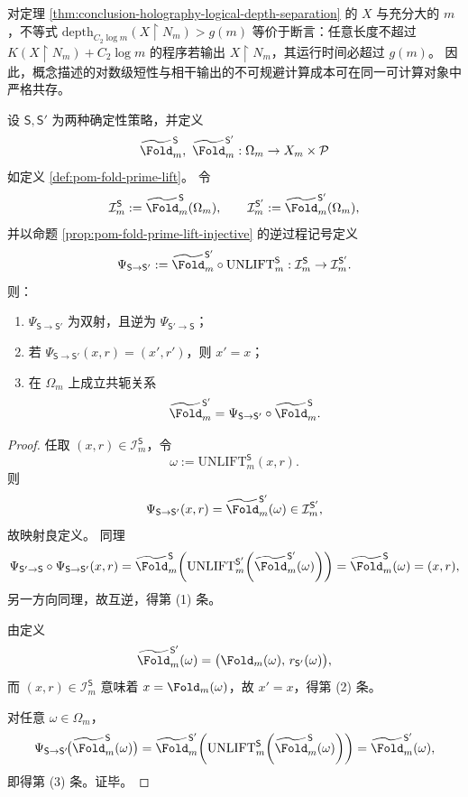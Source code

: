 \begin{remark}[低信息并不蕴含可快速识别]\label{rem:conclusion-low-information-not-fast-recognition}
对定理 \ref{thm:conclusion-holography-logical-depth-separation} 的 \(X\) 与充分大的 \(m\)，不等式
\(
\mathrm{depth}_{C_2\log m}(X\upharpoonright N_m)>g(m)
\)
等价于断言：任意长度不超过 \(K(X\upharpoonright N_m)+C_2\log m\) 的程序若输出 \(X\upharpoonright N_m\)，其运行时间必超过 \(g(m)\)。
因此，概念描述的对数级短性与相干输出的不可规避计算成本可在同一可计算对象中严格共存。
\end{remark}

\begin{theorem}\label{thm:conclusion-prime-strategy-computable-conjugacy}
设 \(\mathsf S,\mathsf S'\) 为两种确定性策略，并定义
\[
\widetilde{\Fold}_m^{\mathsf S},\ \widetilde{\Fold}_m^{\mathsf S'}:\Omega_m\to X_m\times\mathcal P
\]
如定义 \ref{def:pom-fold-prime-lift}。
令
\[
\mathcal I_m^{\mathsf S}:=\widetilde{\Fold}_m^{\mathsf S}(\Omega_m),\qquad
\mathcal I_m^{\mathsf S'}:=\widetilde{\Fold}_m^{\mathsf S'}(\Omega_m),
\]
并以命题 \ref{prop:pom-fold-prime-lift-injective} 的逆过程记号定义
\[
\Psi_{\mathsf S\to\mathsf S'}
:=
\widetilde{\Fold}_m^{\mathsf S'}\circ
\mathrm{UNLIFT}_m^{\mathsf S}
:\mathcal I_m^{\mathsf S}\to\mathcal I_m^{\mathsf S'}.
\]
则：
\begin{enumerate}
  \item \(\Psi_{\mathsf S\to\mathsf S'}\) 为双射，且逆为 \(\Psi_{\mathsf S'\to\mathsf S}\)；
  \item 若 \(\Psi_{\mathsf S\to\mathsf S'}(x,r)=(x',r')\)，则 \(x'=x\)；
  \item 在 \(\Omega_m\) 上成立共轭关系
  \[
  \widetilde{\Fold}_m^{\mathsf S'}
  =
  \Psi_{\mathsf S\to\mathsf S'}\circ \widetilde{\Fold}_m^{\mathsf S}.
  \]
\end{enumerate}
\end{theorem}
\begin{proof}
任取 \((x,r)\in \mathcal I_m^{\mathsf S}\)，令
\[
\omega:=\mathrm{UNLIFT}_m^{\mathsf S}(x,r).
\]
则
\[
\Psi_{\mathsf S\to\mathsf S'}(x,r)=\widetilde{\Fold}_m^{\mathsf S'}(\omega)\in \mathcal I_m^{\mathsf S'},
\]
故映射良定义。
同理
\[
\Psi_{\mathsf S'\to\mathsf S}\circ\Psi_{\mathsf S\to\mathsf S'}(x,r)
=
\widetilde{\Fold}_m^{\mathsf S}\!\left(
\mathrm{UNLIFT}_m^{\mathsf S'}\!\left(\widetilde{\Fold}_m^{\mathsf S'}(\omega)\right)
\right)
=
\widetilde{\Fold}_m^{\mathsf S}(\omega)
=(x,r),
\]
另一方向同理，故互逆，得第 (1) 条。

由定义
\[
\widetilde{\Fold}_m^{\mathsf S'}(\omega)=\bigl(\Fold_m(\omega),\,r_{\mathsf S'}(\omega)\bigr),
\]
而 \((x,r)\in\mathcal I_m^{\mathsf S}\) 意味着 \(x=\Fold_m(\omega)\)，故 \(x'=x\)，得第 (2) 条。

对任意 \(\omega\in\Omega_m\)，
\[
\Psi_{\mathsf S\to\mathsf S'}\!\bigl(\widetilde{\Fold}_m^{\mathsf S}(\omega)\bigr)
=
\widetilde{\Fold}_m^{\mathsf S'}\!\left(
\mathrm{UNLIFT}_m^{\mathsf S}\!\left(\widetilde{\Fold}_m^{\mathsf S}(\omega)\right)
\right)
=
\widetilde{\Fold}_m^{\mathsf S'}(\omega),
\]
即得第 (3) 条。证毕。
\end{proof}

